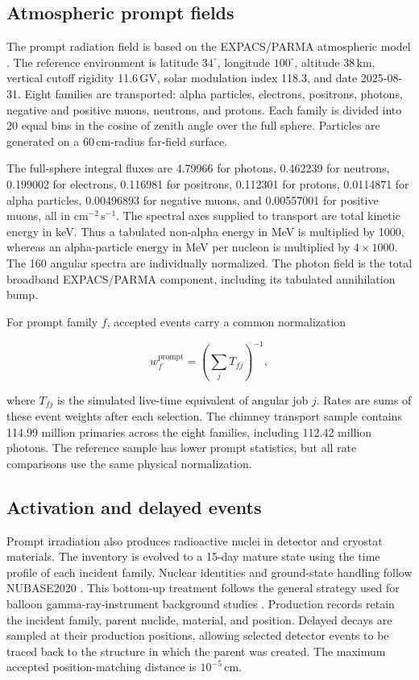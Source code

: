 \documentclass[11pt]{article}
\begin{document}
\subsection{Atmospheric prompt fields}

The prompt radiation field is based on the EXPACS/PARMA atmospheric model
\citep{Sato2015,Sato2016}. The reference environment is latitude
$34^{\circ}$, longitude $100^{\circ}$, altitude 38\,km, vertical cutoff
rigidity 11.6\,GV, solar modulation index 118.3, and date 2025-08-31. Eight
families are transported: alpha particles, electrons, positrons, photons,
negative and positive muons, neutrons, and protons. Each family is divided into
20 equal bins in the cosine of zenith angle over the full sphere. Particles are
generated on a 60\,cm-radius far-field surface.

The full-sphere integral fluxes are 4.79966 for photons, 0.462239 for neutrons,
0.199002 for electrons, 0.116981 for positrons, 0.112301 for protons, 0.0114871
for alpha particles, 0.00496893 for negative muons, and 0.00557001 for positive
muons, all in cm$^{-2}$\,s$^{-1}$. The spectral axes supplied to transport are
total kinetic energy in keV. Thus a tabulated non-alpha energy in MeV is
multiplied by 1000, whereas an alpha-particle energy in MeV per nucleon is
multiplied by $4\times1000$. The 160 angular spectra are individually
normalized. The photon field is the total broadband EXPACS/PARMA component,
including its tabulated annihilation bump.

For prompt family $f$, accepted events carry a common normalization

\begin{equation}
  w_f^{\mathrm{prompt}}=\left(\sum_j T_{fj}\right)^{-1},
  \label{eq:promptweight}
\end{equation}

where $T_{fj}$ is the simulated live-time equivalent of angular job $j$.
Rates are sums of these event weights after each selection. The chimney
transport sample contains 114.99 million primaries across the eight families,
including 112.42 million photons. The reference sample has lower prompt
statistics, but all rate comparisons use the same physical normalization.

\subsection{Activation and delayed events}

Prompt irradiation also produces radioactive nuclei in detector and cryostat
materials. The inventory is evolved to a 15-day mature state using the time
profile of each incident family. Nuclear identities and ground-state handling
follow NUBASE2020 \citep{Kondev2021}. This bottom-up treatment follows the
general strategy used for balloon gamma-ray-instrument background studies
\citep{Gallego2025}. Production records retain the incident
family, parent nuclide, material, and position. Delayed decays are sampled at
their production positions, allowing selected detector events to be traced
back to the structure in which the parent was created. The maximum accepted
position-matching distance is $10^{-5}$\,cm.
\end{document}
